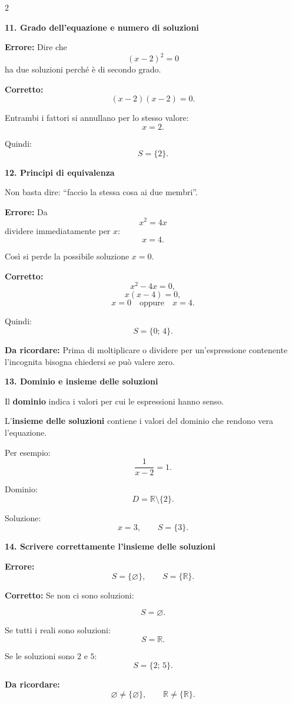 \documentclass[9pt,a4paper]{extarticle}
\newcommand{\R}{\mathbb{R}}
\newcommand{\err}[1]{%
	{\color{errore}\textbf{Errore:}} #1
}
\newcommand{\corr}[1]{%
	{\color{corretto}\textbf{Corretto:}} #1
}
\newcommand{\regola}[1]{%
	{\color{titolo}\textbf{Da ricordare:}} #1
}
\newcommand{\voce}[1]{%
	\vspace{3pt}
	{\color{titolo}\textbf{#1}}\par
	\vspace{1pt}
}
\begin{document}
\begin{multicols}{2}
\small

\voce{11. Grado dell'equazione e numero di soluzioni}

\err{Dire che
\[
(x-2)^2=0
\]
ha due soluzioni perché è di secondo grado.}

\corr{
\[
(x-2)(x-2)=0.
\]
}

Entrambi i fattori si annullano per lo stesso valore:
\[
x=2.
\]

Quindi:
\[
S=\{2\}.
\]

\voce{12. Principi di equivalenza}

Non basta dire: ``faccio la stessa cosa ai due membri''.

\err{Da
\[
x^2=4x
\]
dividere immediatamente per $x$:
\[
x=4.
\]
}

Così si perde la possibile soluzione $x=0$.

\corr{
\[
x^2-4x=0,
\]
\[
x(x-4)=0,
\]
\[
x=0
\quad\text{oppure}\quad
x=4.
\]
}

Quindi:
\[
S=\{0;\,4\}.
\]

\regola{Prima di moltiplicare o dividere per un'espressione
contenente l'incognita bisogna chiedersi se può valere zero.}

\voce{13. Dominio e insieme delle soluzioni}

Il \textbf{dominio} indica i valori per cui le espressioni hanno senso.

L'\textbf{insieme delle soluzioni} contiene i valori del dominio
che rendono vera l'equazione.

Per esempio:
\[
\frac1{x-2}=1.
\]

Dominio:
\[
D=\R\setminus\{2\}.
\]

Soluzione:
\[
x=3,
\qquad
S=\{3\}.
\]

\voce{14. Scrivere correttamente l'insieme delle soluzioni}

\err{
\[
S=\{\varnothing\},
\qquad
S=\{\R\}.
\]
}

\corr{Se non ci sono soluzioni:}
\[
S=\varnothing.
\]

Se tutti i reali sono soluzioni:
\[
S=\R.
\]

Se le soluzioni sono $2$ e $5$:
\[
S=\{2;\,5\}.
\]

\regola{
\[
\varnothing\neq\{\varnothing\},
\qquad
\R\neq\{\R\}.
\]
}


\end{multicols}
\end{document}
